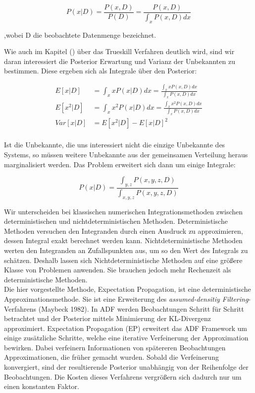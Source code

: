 \documentclass[12pt,a4paper]{scrartcl}
\numberwithin{equation}{section}
\begin{document}
{  \begin{equation}
   P(x|D) = \frac{P(x,D)}{P(D)} = \frac{P(x,D)}{\int_x P(x,D) dx}
  \end{equation}
  
  ,wobei D die beobachtete Datenmenge bezeichnet. 
  
  Wie auch im Kapitel () über das Trueskill Verfahren deutlich wird, sind wir daran interessiert
  die Posterior Erwartung und Varianz der Unbekannten zu bestimmen. Diese ergeben sich als Integrale 
  über den Posterior: 
  
  \begin{equation}
  \begin{split}
   E[x|D] &= \int_x xP(x|D) dx = \frac{\int_x x P(x,D) dx}{\int_x P(x,D) dx } \\
   E[x^2|D] &= \int_x x^2P(x|D) dx = \frac{\int_x x^2 P(x,D) dx}{\int_x P(x,D) dx } \\
   Var[x|D] &= E[x^2|D] - E[x|D]^2 \\
  \end{split}
  \end{equation}
  
  Ist die Unbekannte, die uns interessiert nicht die einzige Unbekannte des Systems, so müssen weitere Unbekannte
  aus der gemeinsamen Verteilung heraus marginalisiert werden. Das Problem erweitert sich dann um einige Integrale: 
  
  \begin{equation}
   P(x|D) = \frac{\int_{y,z} P(x,y,z,D)}{\int_{x,y,z} P(x,y,z,D)}
  \end{equation}

  Wir unterscheiden bei klassischen numerischen Integrationsmethoden zwischen deterministischen und nichtdeterministischen Methoden. 
  Deterministische Methoden versuchen den Integranden durch einen Ausdruck zu approximieren, dessen Integral
  exakt berechnet werden kann. Nichtdeterministische Methoden werten den Integranden an Zufallspunkten aus, um
  so den Wert des Integrals zu schätzen. Deshalb lassen sich Nichtdeterministische Methoden auf eine größere Klasse von Problemen 
  anwenden. Sie brauchen jedoch mehr Rechenzeit als deterministische Methoden. \\
  Die hier vorgestellte Methode, Expectation Propagation, ist eine deterministische Approximationsmethode. 
  Sie ist eine Erweiterung des \textit{assumed-densitiy Filtering}-Verfahrens (Maybeck 1982).
  In ADF werden Beobachtungen Schritt für Schritt betrachtet und der Posterior mittels Minimierung der KL-Divergenz approximiert.
  Expectation Propagation (EP) erweitert das ADF Framework um einige zusätzliche Schritte, welche eine 
  iterative Verfeinerung der Approximation bewirken. Dabei verfeinern Informationen von spätereren
  Beobachtungen Approximationen, die früher gemacht wurden. Sobald die Verfeinerung konvergiert, sind der resultierende
  Posterior unabhängig von der Reihenfolge der Beobachtungen.
  Die Kosten dieses Verfahrens vergrößern sich dadurch nur um einen konstanten Faktor. 
  
}
\end{document}
